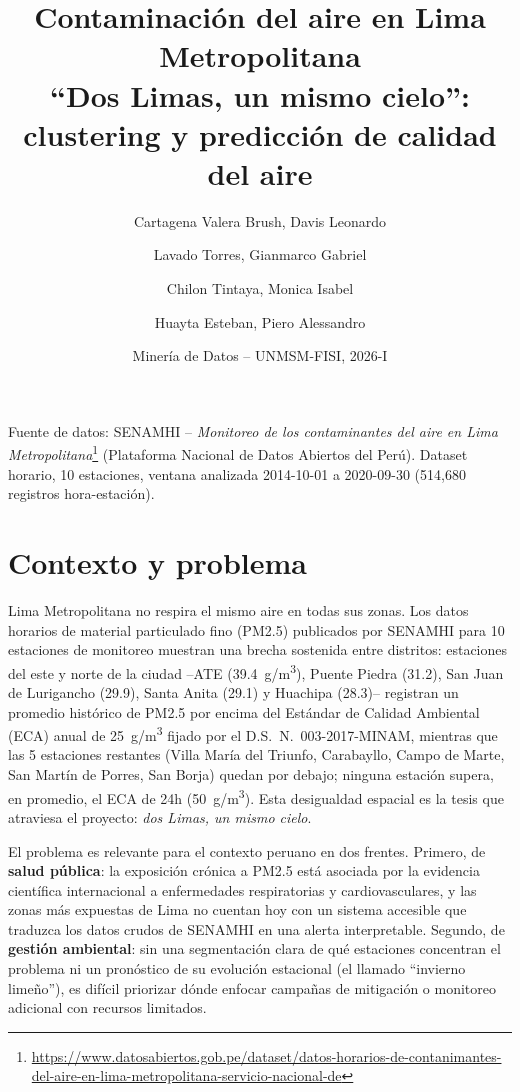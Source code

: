 \documentclass[11pt,a4paper]{article}
\title{\textbf{Contaminación del aire en Lima Metropolitana}\\[0.3em]
\large ``Dos Limas, un mismo cielo'': clustering y predicción de calidad del aire}
\author{
Cartagena Valera Brush, Davis Leonardo \and
Lavado Torres, Gianmarco Gabriel \and
Chilon Tintaya, Monica Isabel \and
Huayta Esteban, Piero Alessandro
}
\date{Minería de Datos -- UNMSM-FISI, 2026-I}
\begin{document}
\renewcommand{\tablename}{Tabla}

\maketitle
\thispagestyle{fancy}

\vspace{-1.5em}
\begin{center}
\small Fuente de datos: SENAMHI -- \emph{Monitoreo de los contaminantes del aire en Lima Metropolitana}\footnote{\url{https://www.datosabiertos.gob.pe/dataset/datos-horarios-de-contanimantes-del-aire-en-lima-metropolitana-servicio-nacional-de}}
(Plataforma Nacional de Datos Abiertos del Perú). Dataset horario, 10 estaciones, ventana analizada
2014-10-01 a 2020-09-30 (514{,}680 registros hora-estación).
\end{center}

\vspace{1em}

\section{Contexto y problema}

Lima Metropolitana no respira el mismo aire en todas sus zonas. Los datos horarios de
material particulado fino (PM2.5) publicados por SENAMHI para 10 estaciones de
monitoreo muestran una brecha sostenida entre distritos: estaciones del este y norte de
la ciudad --ATE (39.4~\textmu g/m\textsuperscript{3}), Puente Piedra (31.2), San Juan de
Lurigancho (29.9), Santa Anita (29.1) y Huachipa (28.3)-- registran un promedio
histórico de PM2.5 por encima del Estándar de Calidad Ambiental (ECA) anual de
25~\textmu g/m\textsuperscript{3} fijado por el D.S.\ N.\textdegree~003-2017-MINAM,
mientras que las 5 estaciones restantes (Villa María del Triunfo, Carabayllo, Campo de
Marte, San Martín de Porres, San Borja) quedan por debajo; ninguna estación supera, en
promedio, el ECA de 24h (50~\textmu g/m\textsuperscript{3}). Esta desigualdad espacial
es la tesis que atraviesa el proyecto: \emph{dos Limas, un mismo cielo}.

El problema es relevante para el contexto peruano en dos frentes. Primero, de
\textbf{salud pública}: la exposición crónica a PM2.5 está asociada por la evidencia
científica internacional a enfermedades respiratorias y cardiovasculares, y las zonas
más expuestas de Lima no cuentan hoy con un sistema accesible que traduzca los datos
crudos de SENAMHI en una alerta interpretable. Segundo, de \textbf{gestión ambiental}:
sin una segmentación clara de qué estaciones concentran el problema ni un pronóstico de
su evolución estacional (el llamado ``invierno limeño''), es difícil priorizar dónde
enfocar campañas de mitigación o monitoreo adicional con recursos limitados.
\end{document}
